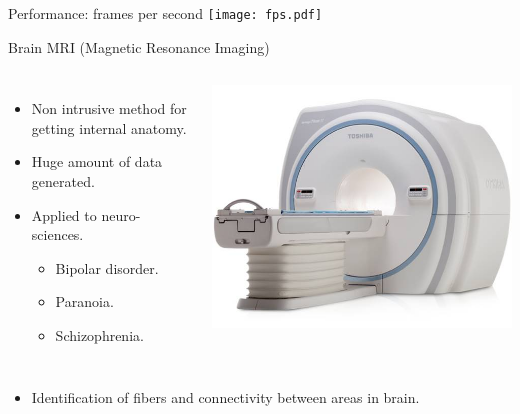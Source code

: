 \begin{frame}{Performance: frames per second}
\texttt{[image: fps.pdf]}
\end{frame}

\begin{frame}[t]{Brain MRI (Magnetic Resonance Imaging)}
\begin{columns}
\begin{itemize}
  \item Non intrusive method for getting internal anatomy.
  \item Huge amount of data generated.
  \item Applied to neuro-sciences.
    \begin{itemize}
      \item Bipolar disorder.
      \item Paranoia.
      \item Schizophrenia.
    \end{itemize}
\end{itemize}

\includegraphics[width=\textwidth]{img/mri-scanner.jpg}
\end{columns}

\vspace{2em}
\begin{itemize}
  \item Identification of fibers and connectivity between areas in brain.
\end{itemize}

\end{frame}

